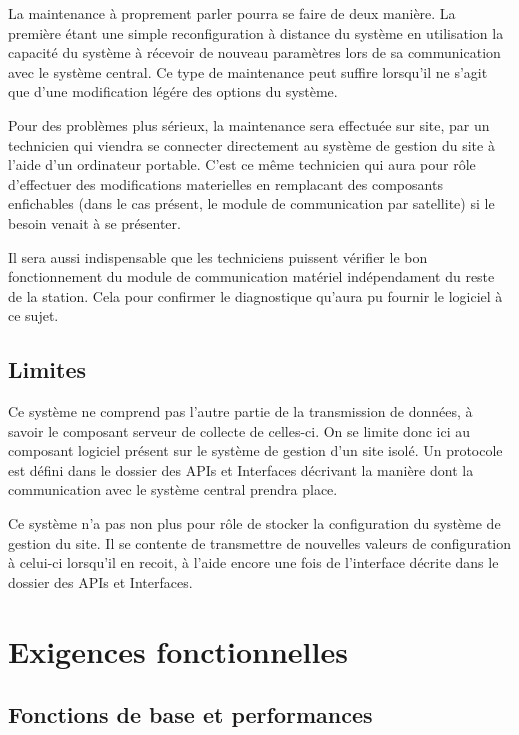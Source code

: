 
La maintenance à proprement parler pourra se faire de deux manière. La première étant une simple reconfiguration à distance du système en utilisation la capacité du système à récevoir de nouveau paramètres lors de sa communication avec le système central. Ce type de maintenance peut suffire lorsqu'il ne s'agit que d'une modification légére des options du système.

Pour des problèmes plus sérieux, la maintenance sera effectuée sur site, par un technicien qui viendra se connecter directement au système de gestion du site à l'aide d'un ordinateur portable. C'est ce même technicien qui aura pour rôle d'effectuer des modifications materielles en remplacant des composants enfichables (dans le cas présent, le module de communication par satellite) si le besoin venait à se présenter.

Il sera aussi indispensable que les techniciens puissent vérifier le bon fonctionnement du module de communication matériel indépendament du reste de la station. Cela pour confirmer le diagnostique qu'aura pu fournir le logiciel à ce sujet.

\subsection{Limites}

Ce système ne comprend pas l'autre partie de la transmission de données, à savoir le composant serveur de collecte de celles-ci. On se limite donc ici au composant logiciel présent sur le système de gestion d'un site isolé. Un protocole est défini dans le dossier des APIs et Interfaces décrivant la manière dont la communication avec le système central prendra place.

Ce système n'a pas non plus pour rôle de stocker la configuration du système de gestion du site. Il se contente de transmettre de nouvelles valeurs de configuration à celui-ci lorsqu'il en recoit, à l'aide encore une fois de l'interface décrite dans le dossier des APIs et Interfaces.

\section{Exigences fonctionnelles}

\subsection{Fonctions de base et performances}

